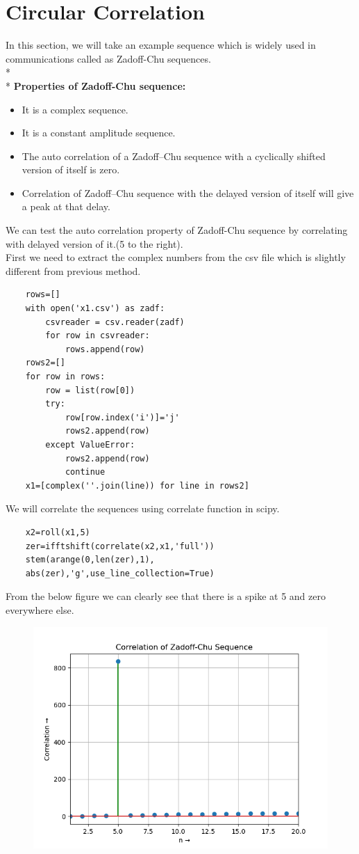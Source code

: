 \documentclass[11pt, a4paper]{article}
\begin{document}
\section{Circular Correlation}
In this section, we will take an example sequence which is widely used in communications called as Zadoff-Chu sequences.\\*\\*
\textbf{Properties of Zadoff-Chu sequence:}
\begin{itemize}
    \item It is a complex sequence.
    \item It is a constant amplitude sequence.
    \item The auto correlation of a Zadoff–Chu sequence with a cyclically shifted version
of itself is zero.
    \item Correlation of Zadoff–Chu sequence with the delayed version of itself will give
a peak at that delay.
\end{itemize}
We can test the auto correlation property of Zadoff-Chu sequence by correlating with delayed version of it.(5 to the right).\\
First we need to extract the complex numbers from the csv file which is slightly different from previous method.
\begin{verbatim}
    rows=[]
    with open('x1.csv') as zadf:
        csvreader = csv.reader(zadf)
        for row in csvreader:
            rows.append(row)
    rows2=[]
    for row in rows:
        row = list(row[0])
        try:
            row[row.index('i')]='j'
            rows2.append(row)
        except ValueError:
            rows2.append(row)
            continue
    x1=[complex(''.join(line)) for line in rows2]
\end{verbatim}
We will correlate the sequences using correlate function in scipy.
\begin{verbatim}
    x2=roll(x1,5)
    zer=ifftshift(correlate(x2,x1,'full'))
    stem(arange(0,len(zer),1),
    abs(zer),'g',use_line_collection=True)
\end{verbatim}
From the below figure we can clearly see that there is a spike at 5 and zero everywhere else.
\begin{figure}[H]
   	\centering
   	\includegraphics[scale=0.5]{Figure_6.png}
\end{figure}
\end{document}
